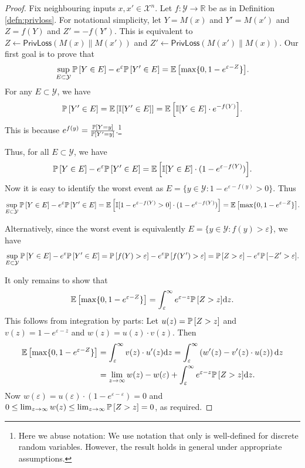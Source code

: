 \documentclass{jpc}
\newcommand{\ex}[2]{{\ifx&#1& \mathbb{E} \else
\underset{#1}{\mathbb{E}} \fi \left[#2\right]}}
\newcommand{\pr}[2]{{\ifx&#1& \mathbb{P} \else
\underset{#1}{\mathbb{P}} \fi \left[#2\right]}}
\newcommand{\eps}{\varepsilon}
\newcommand{\privloss}[2]{\mathsf{PrivLoss}\left(#1\middle\|#2\right)}
\newcommand{\dx}[1][x]{\mathrm{d}#1}
\newcommand{\R}{\mathbb{R}}
\begin{document}
\begin{proof}
Fix neighbouring inputs $x,x'\in\mathcal{X}^n$. 
Let $f\colon \mathcal{Y} \to \R$ be as in Definition \ref{defn:privloss}.
For notational simplicity, let $Y=M(x)$ and $Y'=M(x')$ and $Z=f(Y)$ and $Z'=-f(Y')$. This is equivalent to $Z \gets \privloss{M(x)}{M(x')}$ and $Z' \gets \privloss{M(x')}{M(x)}$.
Our first goal is to prove that
$$\sup_{E \subset \mathcal{Y}} \pr{}{Y \in E} - e^\eps \pr{}{Y' \in E} = \ex{}{\max\{0,1-e^{\eps-Z}\}}.
$$
For any $E \subset \mathcal{Y}$, we have $$\pr{}{Y' \in E} = \ex{}{\mathbb{I}[Y' \in E]} = \ex{}{\mathbb{I}[Y \in E]\cdot e^{-f(Y)}}.$$ This is because $e^{f(y)} = \frac{\pr{}{Y=y}}{\pr{}{Y'=y}}$.\footnote{Here we abuse notation: We use notation that only is well-defined for discrete random variables. However, the result holds in general under appropriate assumptions.}

Thus, for all $E \subset \mathcal{Y}$, we have $$\pr{}{Y \in E} - e^\eps \pr{}{Y' \in E} = \ex{}{\mathbb{I}[Y \in E] \cdot (1 - e^{\eps-f(Y)})}.$$ Now it is easy to identify the worst event as $E = \{y \in \mathcal{Y} : 1-e^{\eps-f(y)}>0\}$. Thus $$\sup_{E \subset \mathcal{Y}} \pr{}{Y \in E} - e^\eps \pr{}{Y' \in E} = \ex{}{\mathbb{I}[1-e^{\eps-f(Y)}>0] \cdot (1 - e^{\eps-f(Y)})} = \ex{}{\max\{0,1-e^{\eps-Z}\}}.$$

\noindent Alternatively, since the worst event is equivalently $E = \{ y \in \mathcal{Y} : f(y) > \eps \}$, we have $$\sup_{E \subset \mathcal{Y}} \pr{}{Y \in E} - e^\eps \pr{}{Y' \in E} = \pr{}{f(Y)>\eps} - e^\eps \pr{}{f(Y')>\eps} = \pr{}{Z>\eps}-e^\eps \pr{}{-Z'>\eps}.$$

\noindent It only remains to show that $$\ex{}{\max\{0,1-e^{\eps-Z}\}} = \int_\eps^\infty e^{\eps-z} \pr{}{Z>z} \dx[z].$$
This follows from integration by parts: Let $u(z) = \pr{}{Z>z}$ and $v(z) = 1-e^{\eps-z}$ and $w(z)=u(z) \cdot v(z)$. Then 
\begin{align*}
    \ex{}{\max\{0,1-e^{\eps-Z}\}} &= \int_\eps^\infty v(z) \cdot u'(z) \dx[z] = \int_\eps^\infty \left( w'(z) - v'(z) \cdot u(z) \right) \dx[z]\\
    &= \lim_{z \to \infty} w(z) - w(\eps) + \int_\eps^\infty e^{\eps-z} \pr{}{Z>z} \dx[z].
\end{align*}
Now $w(\eps) = u(\eps) \cdot (1-e^{\eps-\eps}) = 0$ and $0 \le \lim_{z \to \infty} w(z) \le \lim_{z \to \infty} \pr{}{Z>z} = 0$, as required.
\end{proof}
\end{document}
